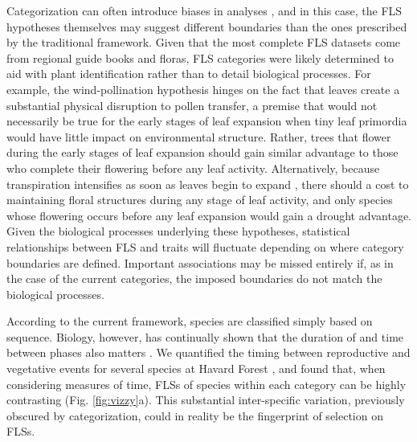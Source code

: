 \documentclass{article}
\begin{document}
\noindent Categorization can often introduce biases in analyses \citep{Naggara2011,Royston2006}, and in this case, the FLS hypotheses themselves may suggest different boundaries than the ones prescribed by the traditional framework. Given that the most complete FLS datasets come from regional guide books and floras, FLS categories were likely determined to aid with plant identification rather than to detail biological processes. For example, the wind-pollination hypothesis hinges on the fact that leaves create a substantial physical disruption to pollen transfer, a premise that would not necessarily be true for the early stages of leaf expansion when tiny leaf primordia would have little impact on environmental structure. Rather, trees that flower during the early stages of leaf expansion should gain similar advantage to those who complete their flowering before any leaf activity. Alternatively, because transpiration intensifies as soon as leaves begin to expand \citep{Breda1996,Wang2018}, there should a cost to maintaining floral structures during any stage of leaf activity, and only species whose flowering occurs before any leaf expansion would gain a drought advantage. Given the biological processes underlying these hypotheses, statistical relationships between FLS and traits will fluctuate depending on where category boundaries are defined. Important associations may be missed entirely if, as in the case of the current categories, the imposed boundaries do not match the biological processes.

\noindent According to the current framework, species are classified simply based on sequence. Biology, however, has continually shown that the duration of and time between phases also matters \citep{Inouye2019}. We quantified the timing between reproductive and vegetative events for several species at Havard Forest \citep{OKeefe2015}, and found that, when considering measures of time, FLSs of species within each category can be highly contrasting (Fig. \ref{fig:vizzy}a). This substantial inter-specific variation, previously obscured by categorization, could in reality be the fingerprint of selection on FLSs. %
\end{document}
